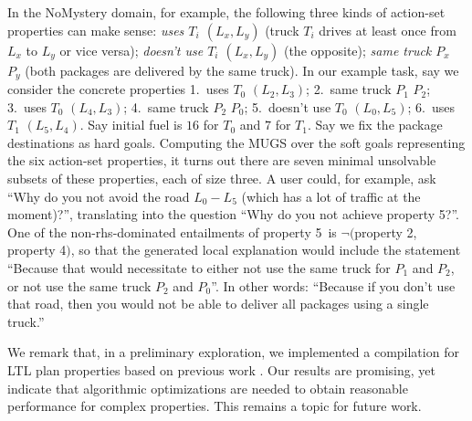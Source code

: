 In the NoMystery domain, for example, the following three kinds of
action-set properties can make sense: \emph{uses $T_i$ $(L_x,L_y)$}
(truck $T_i$ drives at least once from $L_x$ to $L_y$ or vice versa);
\emph{doesn't use $T_i$ $(L_x,L_y)$} (the opposite); \emph{same truck
  $P_x$ $P_y$} (both packages are delivered by the same truck). In our
example task, say we consider the concrete properties 1.\ uses $T_0$
$(L_2,L_3)$; 2.\ same truck $P_1$ $P_2$; 3.\ uses $T_0$ $(L_4,L_3)$;
4.\ same truck $P_2$ $P_0$; 5.\ doesn't use $T_0$ $(L_0,L_5)$;
6.\ uses $T_1$ $(L_5,L_4)$. Say initial fuel is $16$ for $T_0$ and $7$
for $T_1$. Say we fix the package destinations as hard
goals. Computing the MUGS over the soft goals representing the six
action-set properties, it turns out there are seven minimal unsolvable
subsets of these properties, each of size three. A user could, for
example, ask ``Why do you not avoid the road $L_0-L_5$ (which has a
lot of traffic at the moment)?'', translating into the question ``Why
do you not achieve property 5?''. One of the non-rhs-dominated
entailments of property 5\ is $\neg($property 2, property 4$)$, so
that the generated local explanation would include the statement
``Because that would necessitate to either not use the same truck for
$P_1$ and $P_2$, or not use the same truck $P_2$ and $P_0$''. In other
words: ``Because if you don't use that road, then you would not be
able to deliver all packages using a single truck.''

%
%

We remark that, in a preliminary exploration, we implemented a
compilation for LTL plan properties based on previous work
\cite{edelkamp:icaps-06,baier:etal:ai-09}. Our results are promising,
yet indicate that algorithmic optimizations are needed to obtain
reasonable performance for complex properties. This remains a topic
for future work.





